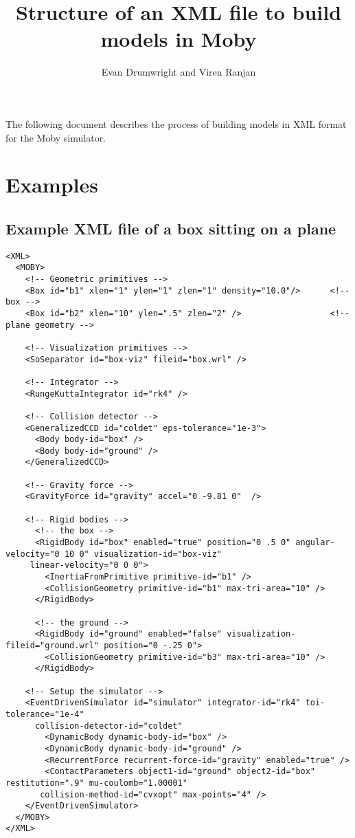 \documentclass{article}
\begin{document}
\begin{landscape}
\title{Structure of an XML file to build models in Moby}
\author{Evan Drumwright and Viren Ranjan}
\maketitle

The following document describes the process of building models in XML format
for the Moby simulator.  

\section{Examples}

\subsection{Example XML file of a box sitting on a plane}
\begin{verbatim}
<XML>
  <MOBY>
    <!-- Geometric primitives -->
    <Box id="b1" xlen="1" ylen="1" zlen="1" density="10.0"/>      <!-- box -->
    <Box id="b2" xlen="10" ylen=".5" zlen="2" />                  <!-- plane geometry -->

    <!-- Visualization primitives -->
    <SoSeparator id="box-viz" fileid="box.wrl" />

    <!-- Integrator -->
    <RungeKuttaIntegrator id="rk4" />

    <!-- Collision detector -->
    <GeneralizedCCD id="coldet" eps-tolerance="1e-3">
      <Body body-id="box" />
      <Body body-id="ground" />
    </GeneralizedCCD>

    <!-- Gravity force -->
    <GravityForce id="gravity" accel="0 -9.81 0"  />

    <!-- Rigid bodies -->
      <!-- the box -->
      <RigidBody id="box" enabled="true" position="0 .5 0" angular-velocity="0 10 0" visualization-id="box-viz" 
     linear-velocity="0 0 0">
        <InertiaFromPrimitive primitive-id="b1" />
        <CollisionGeometry primitive-id="b1" max-tri-area="10" />
      </RigidBody>

      <!-- the ground -->
      <RigidBody id="ground" enabled="false" visualization-fileid="ground.wrl" position="0 -.25 0">
        <CollisionGeometry primitive-id="b3" max-tri-area="10" />  
      </RigidBody>

    <!-- Setup the simulator -->
    <EventDrivenSimulator id="simulator" integrator-id="rk4" toi-tolerance="1e-4"  
      collision-detector-id="coldet" 
        <DynamicBody dynamic-body-id="box" />
        <DynamicBody dynamic-body-id="ground" />
        <RecurrentForce recurrent-force-id="gravity" enabled="true" />
        <ContactParameters object1-id="ground" object2-id="box" restitution=".9" mu-coulomb="1.00001"  
       collision-method-id="cvxopt" max-points="4" />
    </EventDrivenSimulator> 
  </MOBY>
</XML>
\end{verbatim}


\end{landscape}
\end{document}
